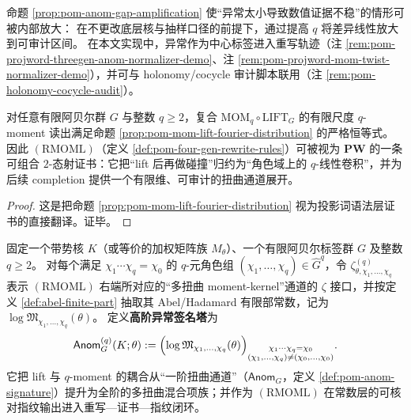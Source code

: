 \begin{remark}\label{rem:pom-anom-gap-amplification-meaning}
命题 \ref{prop:pom-anom-gap-amplification} 使“异常太小导致数值证据不稳”的情形可被内部放大：
在不更改底层核与抽样口径的前提下，通过提高 \(q\) 将差异线性放大到可审计区间。
在本文实现中，异常作为中心标签进入重写轨迹（注 \ref{rem:pom-projword-threegen-anom-normalizer-demo}、注 \ref{rem:pom-projword-mom-twist-normalizer-demo}），并可与 holonomy/cocycle 审计脚本联用（注 \ref{rem:pom-holonomy-cocycle-audit}）。
\end{remark}



\begin{proposition}\label{prop:pom-rmoml-sound}
对任意有限阿贝尔群 \(G\) 与整数 \(q\ge 2\)，复合 \(\mathrm{MOM}_q\circ \mathrm{LIFT}_G\) 的有限尺度 \(q\)-moment 读出满足命题 \ref{prop:pom-mom-lift-fourier-distribution} 的严格恒等式。
因此 \((\mathrm{RMOML})\)（定义 \ref{def:pom-four-gen-rewrite-rules}）可被视为 \(\mathbf{PW}\) 的一条可组合 \(2\)-态射证书：它把“lift 后再做碰撞”归约为“角色域上的 \(q\)-线性卷积”，并为后续 completion 提供一个有限维、可审计的扭曲通道展开。
\end{proposition}
\begin{proof}
这是把命题 \ref{prop:pom-mom-lift-fourier-distribution} 视为投影词语法层证书的直接翻译。证毕。
\end{proof}

\begin{definition}\label{def:pom-anom-signature-tower}
固定一个带势核 \(K\)（或等价的加权矩阵族 \(M_\theta\)）、一个有限阿贝尔标签群 \(G\) 及整数 \(q\ge 2\)。
对每个满足 \(\chi_1\cdots\chi_q=\chi_0\) 的 \(q\)-元角色组 \((\chi_1,\dots,\chi_q)\in\widehat G^q\)，令
\(\zeta^{(q)}_{\theta,\chi_1,\dots,\chi_q}\)
表示 \((\mathrm{RMOML})\) 右端所对应的“多扭曲 moment-kernel”通道的 \(\zeta\) 接口，并按定义 \ref{def:abel-finite-part} 抽取其 Abel/Hadamard 有限部常数，记为 \(\log\mathfrak{M}_{\chi_1,\dots,\chi_q}(\theta)\)。
定义\textbf{高阶异常签名塔}为
\[
\mathsf{Anom}^{(q)}_{G}(K;\theta)
:=\Bigl(\log\mathfrak{M}_{\chi_1,\dots,\chi_q}(\theta)\Bigr)_{\substack{\chi_1\cdots\chi_q=\chi_0\\ (\chi_1,\dots,\chi_q)\neq(\chi_0,\dots,\chi_0)}}.
\]
它把 lift 与 \(q\)-moment 的耦合从“一阶扭曲通道”（\(\mathsf{Anom}_G\)，定义 \ref{def:pom-anom-signature}）提升为全阶的多扭曲混合项族；并作为 \((\mathrm{RMOML})\) 在常数层的可核对指纹输出进入重写—证书—指纹闭环。
\end{definition}

